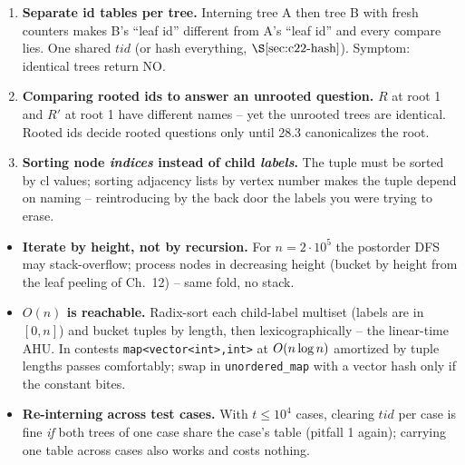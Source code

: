 \begin{warningbox}
\begin{enumerate}[nosep,leftmargin=1.6em]
  \item \textbf{Separate id tables per tree.} Interning tree A then tree B with
        fresh counters makes B's ``leaf id'' different from A's ``leaf id'' and
        every compare lies.  One shared \(\mathit{tid}\) (or hash everything,
        \(\secref{c22-hash}\)).  Symptom: identical trees return NO.
  \item \textbf{Comparing rooted ids to answer an unrooted question.} \(R\) at
        root 1 and \(R'\) at root 1 have different names -- yet the unrooted trees
        are identical.  Rooted ids decide rooted questions only until 28.3
        canonicalizes the root.
  \item \textbf{Sorting node \emph{indices} instead of child \emph{labels}.} The
        tuple must be sorted by \(\mathrm{cl}\) values; sorting adjacency lists by vertex
        number makes the tuple depend on naming -- reintroducing by the back door
        the labels you were trying to erase.
\end{enumerate}
\end{warningbox}

\begin{hardeningbox}
\begin{itemize}[nosep,leftmargin=1.4em]
  \item \textbf{Iterate by height, not by recursion.} For \(n=2\cdot10^5\) the
        postorder DFS may stack-overflow; process nodes in decreasing height
        (bucket by height from the leaf peeling of Ch.~12) -- same fold, no stack.
  \item \textbf{\(O(n)\) is reachable.} Radix-sort each child-label multiset
        (labels are in \([0,n]\)) and bucket tuples by length, then lexicographically
        -- the linear-time AHU.  In contests \texttt{map<vector<int>,int>} at
        \(O(n\log n)\) amortized by tuple lengths passes comfortably; swap in
        \texttt{unordered\_map} with a vector hash only if the constant bites.
  \item \textbf{Re-interning across test cases.} With \(t\le10^4\) cases, clearing
        \(\mathit{tid}\) per case is fine \emph{if} both trees of one case share
        the case's table (pitfall 1 again); carrying one table across cases also
        works and costs nothing.
\end{itemize}
\end{hardeningbox}

